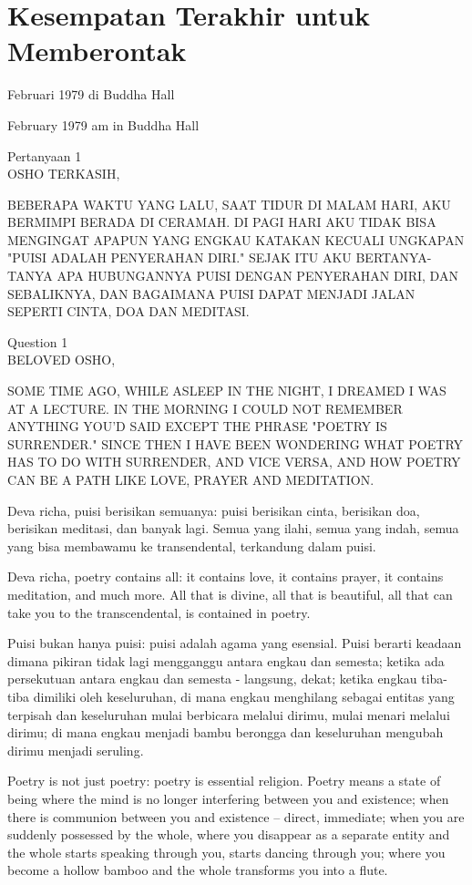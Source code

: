 \chapter{Kesempatan Terakhir untuk Memberontak}

 Februari 1979 di Buddha Hall

 February 1979 am in Buddha Hall

\bahasa
Pertanyaan 1\\
OSHO TERKASIH,

BEBERAPA WAKTU YANG LALU, SAAT TIDUR DI MALAM HARI, AKU BERMIMPI BERADA DI CERAMAH. DI PAGI HARI AKU TIDAK BISA MENGINGAT APAPUN YANG ENGKAU KATAKAN KECUALI UNGKAPAN "PUISI ADALAH PENYERAHAN DIRI." SEJAK ITU AKU BERTANYA-TANYA APA HUBUNGANNYA PUISI DENGAN PENYERAHAN DIRI, DAN SEBALIKNYA, DAN BAGAIMANA PUISI DAPAT MENJADI JALAN SEPERTI CINTA, DOA DAN MEDITASI.

\english
Question 1\\
BELOVED OSHO,

SOME TIME AGO, WHILE ASLEEP IN THE NIGHT, I DREAMED I WAS AT A LECTURE. IN THE MORNING I COULD NOT REMEMBER ANYTHING YOU'D SAID EXCEPT THE PHRASE "POETRY IS SURRENDER." SINCE THEN I HAVE BEEN WONDERING WHAT POETRY HAS TO DO WITH SURRENDER, AND VICE VERSA, AND HOW POETRY CAN BE A PATH LIKE LOVE, PRAYER AND MEDITATION.

\bahasa
Deva richa, puisi berisikan semuanya: puisi berisikan cinta, berisikan doa, berisikan meditasi, dan banyak lagi. Semua yang ilahi, semua yang indah, semua yang bisa membawamu ke transendental, terkandung dalam puisi.

\english
Deva richa, poetry contains all: it contains love, it contains prayer, it contains meditation, and much more. All that is divine, all that is beautiful, all that can take you to the transcendental, is contained in poetry.

\bahasa
Puisi bukan hanya puisi: puisi adalah agama yang esensial. Puisi berarti keadaan dimana pikiran tidak lagi mengganggu antara engkau dan semesta; ketika ada persekutuan antara engkau dan semesta - langsung, dekat; ketika engkau tiba-tiba dimiliki oleh keseluruhan, di mana engkau menghilang sebagai entitas yang terpisah dan keseluruhan mulai berbicara melalui dirimu, mulai menari melalui dirimu; di mana engkau menjadi bambu berongga dan keseluruhan mengubah dirimu menjadi seruling.

\english
Poetry is not just poetry: poetry is essential religion. Poetry means a state of being where the mind is no longer interfering between you and existence; when there is communion between you and existence -- direct, immediate; when you are suddenly possessed by the whole, where you disappear as a separate entity and the whole starts speaking through you, starts dancing through you; where you become a hollow bamboo and the whole transforms you into a flute.

